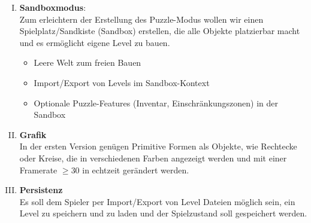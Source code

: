 \documentclass[]{exercise}
\begin{document}
\begin{enumerate} [I.]
\begin{itemize}
                    \item Automatische Level-Progression bei erfolgreichem Abschluss
                    \item Siegesbedingungen, Einschränkungszonen, Inventarsystem für verfügbare Bauteile
                \end{itemize}
            \item \textbf{Sandboxmodus}:\\
                Zum erleichtern der Erstellung des Puzzle-Modus wollen wir einen Spielplatz/Sandkiste (Sandbox) erstellen, die alle Objekte platzierbar macht und es ermöglicht eigene Level zu bauen.
                \begin{itemize}
                    \item Leere Welt zum freien Bauen
                    \item Import/Export von Levels im Sandbox-Kontext
                    \item Optionale Puzzle-Features (Inventar, Einschränkungszonen) in der Sandbox
                \end{itemize}
            \item \textbf{Grafik}\\
                In der ersten Version genügen Primitive Formen als Objekte, wie Rechtecke oder Kreise, die in verschiedenen Farben angezeigt werden und mit einer Framerate $\geq 30$ in echtzeit gerändert werden.
            \item \textbf{Persistenz}\\
                Es soll dem Spieler per Import/Export von Level Dateien möglich sein, ein Level zu speichern und zu laden und der Spielzustand soll gespeichert werden.
        \end{enumerate}
\end{document}
